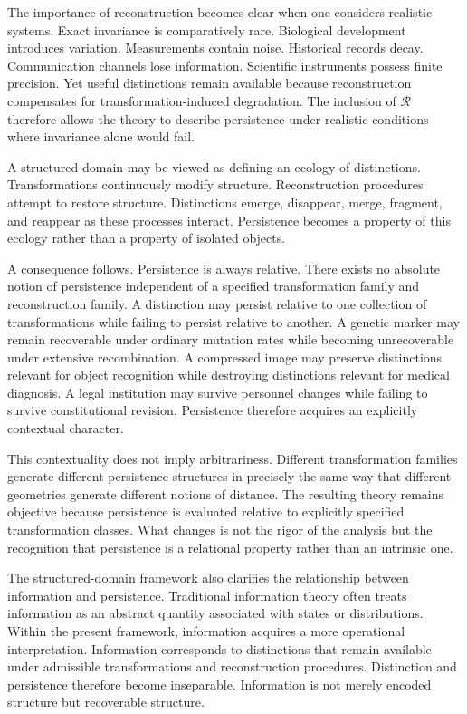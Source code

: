 \documentclass[12pt,oneside]{article}
\theoremstyle{definition}
\begin{document}
The importance of reconstruction becomes clear when one considers realistic systems. Exact invariance is comparatively rare. Biological development introduces variation. Measurements contain noise. Historical records decay. Communication channels lose information. Scientific instruments possess finite precision. Yet useful distinctions remain available because reconstruction compensates for transformation-induced degradation. The inclusion of \(\mathcal{R}\) therefore allows the theory to describe persistence under realistic conditions where invariance alone would fail.

A structured domain may be viewed as defining an ecology of distinctions. Transformations continuously modify structure. Reconstruction procedures attempt to restore structure. Distinctions emerge, disappear, merge, fragment, and reappear as these processes interact. Persistence becomes a property of this ecology rather than a property of isolated objects.

A consequence follows. Persistence is always relative. There exists no absolute notion of persistence independent of a specified transformation family and reconstruction family. A distinction may persist relative to one collection of transformations while failing to persist relative to another. A genetic marker may remain recoverable under ordinary mutation rates while becoming unrecoverable under extensive recombination. A compressed image may preserve distinctions relevant for object recognition while destroying distinctions relevant for medical diagnosis. A legal institution may survive personnel changes while failing to survive constitutional revision. Persistence therefore acquires an explicitly contextual character.

This contextuality does not imply arbitrariness. Different transformation families generate different persistence structures in precisely the same way that different geometries generate different notions of distance. The resulting theory remains objective because persistence is evaluated relative to explicitly specified transformation classes. What changes is not the rigor of the analysis but the recognition that persistence is a relational property rather than an intrinsic one.

The structured-domain framework also clarifies the relationship between information and persistence. Traditional information theory often treats information as an abstract quantity associated with states or distributions. Within the present framework, information acquires a more operational interpretation. Information corresponds to distinctions that remain available under admissible transformations and reconstruction procedures. Distinction and persistence therefore become inseparable. Information is not merely encoded structure but recoverable structure.
\end{document}
